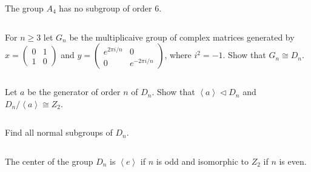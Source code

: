 $$ $$

\begin{ex}
    The group $A_{4}$ has no subgroup of order $6$.
\end{ex}

$$ $$

\begin{ex}
    For $n\geq 3$ let $G_{n}$ be the multiplicaive group of complex matrices generated by $x=\begin{pmatrix}
        0&1\\1&0
    \end{pmatrix}$ and $y=\begin{pmatrix}
        e^{2\pi i/n}&0\\0&e^{-2\pi i/n}
    \end{pmatrix}$, where $i^{2}=-1$. Show that $G_{n}\cong D_{n}$.
\end{ex}

$$ $$

\begin{ex}
    Let $a$ be the generator of order $n$ of $D_{n}$. Show that $\left\langle a\right\rangle\lhd D_{n}$ and $D_{n} /\left\langle a\right\rangle\cong Z_{2}$.
\end{ex}

$$ $$

\begin{ex}
    Find all normal subgroups of $D_{n}$.
\end{ex}

$$ $$

\begin{ex}
    The center of the group $D_{n}$ is $\left\langle e\right\rangle$ if $n$ is odd and isomorphic to $Z_{2}$ if $n$ is even.
\end{ex}

$$ $$

